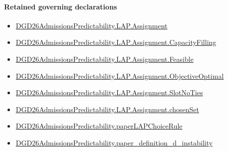 \documentclass[10pt]{article}
\begin{document}
\paragraph{Retained governing declarations}
\begin{itemize}\raggedright
\item \hyperlink{governing-declaration-a9620f375b9ffc53}{DGD26\allowbreak{}Admissions\allowbreak{}Predictability.\allowbreak{}LAP.\allowbreak{}Assignment}
\item \hyperlink{governing-declaration-2fdf10e01c6dcf10}{DGD26\allowbreak{}Admissions\allowbreak{}Predictability.\allowbreak{}LAP.\allowbreak{}Assignment.\allowbreak{}Capacity\allowbreak{}Filling}
\item \hyperlink{governing-declaration-558d825b74162606}{DGD26\allowbreak{}Admissions\allowbreak{}Predictability.\allowbreak{}LAP.\allowbreak{}Assignment.\allowbreak{}Feasible}
\item \hyperlink{governing-declaration-d0742fed343f82c8}{DGD26\allowbreak{}Admissions\allowbreak{}Predictability.\allowbreak{}LAP.\allowbreak{}Assignment.\allowbreak{}Objective\allowbreak{}Optimal}
\item \hyperlink{governing-declaration-9ad3d98d760488d4}{DGD26\allowbreak{}Admissions\allowbreak{}Predictability.\allowbreak{}LAP.\allowbreak{}Assignment.\allowbreak{}Slot\allowbreak{}No\allowbreak{}Ties}
\item \hyperlink{governing-declaration-dd23aabf9cea408a}{DGD26\allowbreak{}Admissions\allowbreak{}Predictability.\allowbreak{}LAP.\allowbreak{}Assignment.\allowbreak{}chosen\allowbreak{}Set}
\item \hyperlink{governing-declaration-d295c7bae8307e45}{DGD26\allowbreak{}Admissions\allowbreak{}Predictability.\allowbreak{}paper\allowbreak{}LAP\allowbreak{}Choice\allowbreak{}Rule}
\item \hyperlink{governing-declaration-ce2c1c7a5233a84a}{DGD26\allowbreak{}Admissions\allowbreak{}Predictability.\allowbreak{}paper\_\allowbreak{}definition\_\allowbreak{}d\_\allowbreak{}instability}
\end{itemize}
\end{document}
